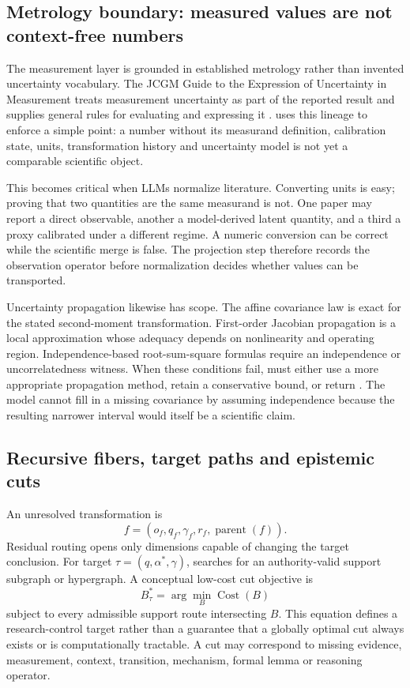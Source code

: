 \subsection{Metrology boundary: measured values are not context-free numbers}

The measurement layer is grounded in established metrology rather than invented uncertainty vocabulary. The JCGM Guide to the Expression of Uncertainty in Measurement treats measurement uncertainty as part of the reported result and supplies general rules for evaluating and expressing it \cite{jcgm2008}. \RAKL{} uses this lineage to enforce a simple point: a number without its measurand definition, calibration state, units, transformation history and uncertainty model is not yet a comparable scientific object.

This becomes critical when LLMs normalize literature. Converting units is easy; proving that two quantities are the same measurand is not. One paper may report a direct observable, another a model-derived latent quantity, and a third a proxy calibrated under a different regime. A numeric conversion can be correct while the scientific merge is false. The projection step therefore records the observation operator before normalization decides whether values can be transported.

Uncertainty propagation likewise has scope. The affine covariance law is exact for the stated second-moment transformation. First-order Jacobian propagation is a local approximation whose adequacy depends on nonlinearity and operating region. Independence-based root-sum-square formulas require an independence or uncorrelatedness witness. When these conditions fail, \RAKL{} must either use a more appropriate propagation method, retain a conservative bound, or return \CannotCheck{}. The model cannot fill in a missing covariance by assuming independence because the resulting narrower interval would itself be a scientific claim.

\subsection{Recursive fibers, target paths and epistemic cuts}
An unresolved transformation is
\begin{equation}f=(o_f,q_f,\gamma_f,r_f,\operatorname{parent}(f)).\end{equation}
Residual routing opens only dimensions capable of changing the target conclusion. For target $\tau=(q,\alpha^*,\gamma)$, \RAKL{} searches for an authority-valid support subgraph or hypergraph. A conceptual low-cost cut objective is
\begin{equation}B^*_{\tau}=\arg\min_B\operatorname{Cost}(B)\end{equation}
subject to every admissible support route intersecting $B$. This equation defines a research-control target rather than a guarantee that a globally optimal cut always exists or is computationally tractable. A cut may correspond to missing evidence, measurement, context, transition, mechanism, formal lemma or reasoning operator.

